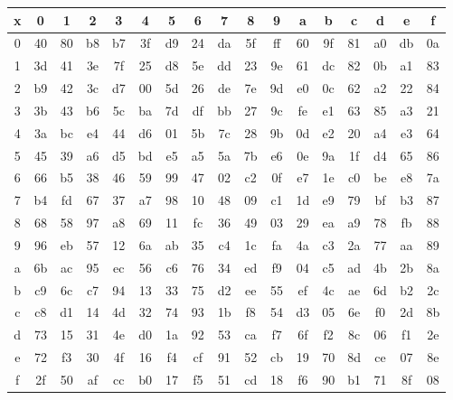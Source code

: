\documentclass[12pt,a4paper]{article}
\begin{document}
\begin{table}[P]
\centering
\begin{subtable}[b]{\textwidth}
    \centering
    \begin{tabular}{|c||c|c|c|c|c|c|c|c|c|c|c|c|c|c|c|c|} 
    \hline
    x  & 0 & 1 & 2 & 3 & 4 & 5 & 6 & 7 & 8 & 9 & a & b & c & d & e & f  \\
    \hline \hline
    0 & 40 & 80 & b8 & b7 & 3f & d9 & 24 & da & 5f & ff & 60 & 9f & 81 & a0 & db & 0a \\ \hline
    1 & 3d & 41 & 3e & 7f & 25 & d8 & 5e & dd & 23 & 9e & 61 & dc & 82 & 0b & a1 & 83 \\ \hline
    2 & b9 & 42 & 3c & d7 & 00 & 5d & 26 & de & 7e & 9d & e0 & 0c & 62 & a2 & 22 & 84 \\ \hline
    3 & 3b & 43 & b6 & 5c & ba & 7d & df & bb & 27 & 9c & fe & e1 & 63 & 85 & a3 & 21 \\ \hline
    4 & 3a & bc & e4 & 44 & d6 & 01 & 5b & 7c & 28 & 9b & 0d & e2 & 20 & a4 & e3 & 64 \\ \hline
    5 & 45 & 39 & a6 & d5 & bd & e5 & a5 & 5a & 7b & e6 & 0e & 9a & 1f & d4 & 65 & 86 \\ \hline
    6 & 66 & b5 & 38 & 46 & 59 & 99 & 47 & 02 & c2 & 0f & e7 & 1e & c0 & be & e8 & 7a \\ \hline
    7 & b4 & fd & 67 & 37 & a7 & 98 & 10 & 48 & 09 & c1 & 1d & e9 & 79 & bf & b3 & 87 \\ \hline
    8 & 68 & 58 & 97 & a8 & 69 & 11 & fc & 36 & 49 & 03 & 29 & ea & a9 & 78 & fb & 88 \\ \hline
    9 & 96 & eb & 57 & 12 & 6a & ab & 35 & c4 & 1c & fa & 4a & c3 & 2a & 77 & aa & 89 \\ \hline
    a & 6b & ac & 95 & ec & 56 & c6 & 76 & 34 & ed & f9 & 04 & c5 & ad & 4b & 2b & 8a \\ \hline
    b & c9 & 6c & c7 & 94 & 13 & 33 & 75 & d2 & ee & 55 & ef & 4c & ae & 6d & b2 & 2c \\ \hline
    c & c8 & d1 & 14 & 4d & 32 & 74 & 93 & 1b & f8 & 54 & d3 & 05 & 6e & f0 & 2d & 8b \\ \hline
    d & 73 & 15 & 31 & 4e & d0 & 1a & 92 & 53 & ca & f7 & 6f & f2 & 8c & 06 & f1 & 2e \\ \hline
    e & 72 & f3 & 30 & 4f & 16 & f4 & cf & 91 & 52 & cb & 19 & 70 & 8d & ce & 07 & 8e \\ \hline
    f & 2f & 50 & af & cc & b0 & 17 & f5 & 51 & cd & 18 & f6 & 90 & b1 & 71 & 8f & 08 \\ \hline
    \end{tabular}

\end{subtable}
\end{table}
\end{document}
